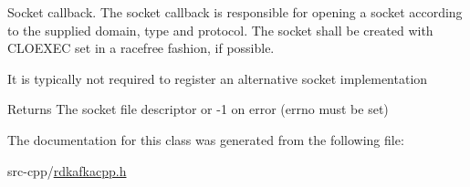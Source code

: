 Socket callback. The socket callback is responsible for opening a socket according to the supplied {\ttfamily domain}, {\ttfamily type} and {\ttfamily protocol}. The socket shall be created with {\ttfamily CLOEXEC} set in a racefree fashion, if possible.

It is typically not required to register an alternative socket implementation

\begin{DoxyReturn}{Returns}
The socket file descriptor or -\/1 on error ({\ttfamily errno} must be set) 
\end{DoxyReturn}


The documentation for this class was generated from the following file:\begin{DoxyCompactItemize}
\item 
src-\/cpp/\hyperlink{rdkafkacpp_8h}{rdkafkacpp.h}\end{DoxyCompactItemize}

